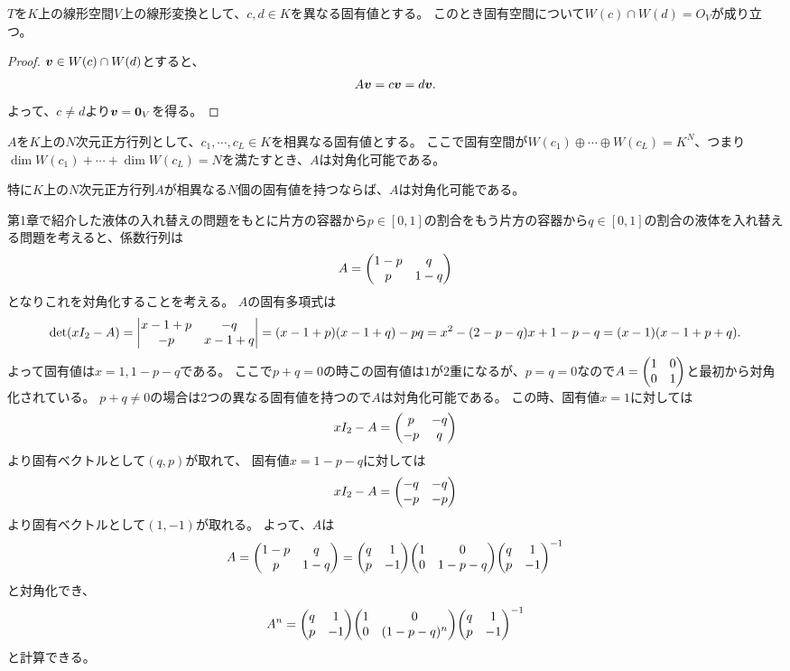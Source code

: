 \begin{lemma}[固有空間の線形独立性]
$T$を$K$上の線形空間$V$上の線形変換として、$c, d \in K$を異なる固有値とする。
このとき固有空間について$W(c)\cap W(d) = O_V$が成り立つ。
\end{lemma}

\begin{proof}
$\vb*{v} \in W(c)\cap W(d)$とすると、
$$
A\vb*{v} = c\vb*{v} = d\vb*{v}.
$$
よって、$c \ne d$より$\vb*{v} = \vb*{0}_V$を得る。
\end{proof}

\begin{theorem}[対角化の十分条件]
$A$を$K$上の$N$次元正方行列として、$c_1, \cdots, c_L \in K$を相異なる固有値とする。
ここで固有空間が$W(c_1)\oplus\cdots\oplus W(c_L) = K^N$、つまり$\dim W(c_1)+\cdots+\dim W(c_L) = N$を満たすとき、$A$は対角化可能である。

特に$K$上の$N$次元正方行列$A$が相異なる$N$個の固有値を持つならば、$A$は対角化可能である。
\end{theorem}

\begin{example}
第1章で紹介した液体の入れ替えの問題をもとに片方の容器から$p \in [0, 1]$の割合をもう片方の容器から$q \in [0, 1]$の割合の液体を入れ替える問題を考えると、係数行列は
$$
A = \mqty(1-p & q \\ p & 1-q)
$$
となりこれを対角化することを考える。
$A$の固有多項式は
$$
\det(x I_2-A)
= \mqty|x-1+p & -q \\ -p & x-1+q|
= (x-1+p)(x-1+q)-p q
= x^2-(2-p-q)x+1-p-q
= (x-1)(x-1+p+q).
$$
よって固有値は$x = 1, 1-p-q$である。
ここで$p+q = 0$の時この固有値は$1$が$2$重になるが、$p = q = 0$なので$A = \mqty(1 & 0 \\ 0 & 1)$と最初から対角化されている。
$p+q \ne 0$の場合は$2$つの異なる固有値を持つので$A$は対角化可能である。
この時、固有値$x = 1$に対しては
$$
x I_2-A = \mqty(p & -q \\ -p & q)
$$
より固有ベクトルとして$(q, p)$が取れて、
固有値$x = 1-p-q$に対しては
$$
x I_2-A = \mqty(-q & -q \\ -p & -p)
$$
より固有ベクトルとして$(1, -1)$が取れる。
よって、$A$は
$$
A
= \mqty(1-p & q \\ p & 1-q)
= \mqty(q & 1 \\ p & -1)\mqty(1 & 0 \\ 0 & 1-p-q)\mqty(q & 1 \\ p & -1)^{-1}
$$
と対角化でき、
$$
A^n
= \mqty(q & 1 \\ p & -1)\mqty(1 & 0 \\ 0 & (1-p-q)^n)\mqty(q & 1 \\ p & -1)^{-1}
$$
と計算できる。
\end{example}


